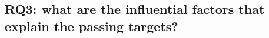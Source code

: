 \subsection{RQ3: what are the influential factors that explain the passing targets?}\label{RQ3-results}
